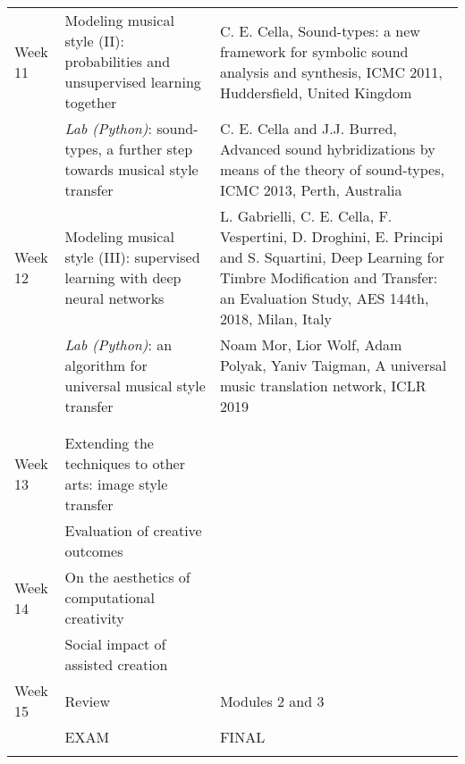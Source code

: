 \documentclass[letterpaper]{inzane_syllabus} %
\begin{document}
\begin{center}
\begin{tabularx}{\textwidth}{p{2cm}p{8cm} @{\hskip 0.5cm} p{9.5cm}}
Week 11 & Modeling musical style (II): probabilities and unsupervised learning together & C. E. Cella, Sound-types: a new framework for symbolic sound analysis and synthesis, ICMC 2011, Huddersfield, United Kingdom  \\

&\emph{Lab (Python)}: sound-types, a further step towards musical style transfer & C. E. Cella and J.J. Burred, Advanced sound hybridizations by means of the theory of sound-types, ICMC 2013, Perth, Australia \\

\arrayrulecolor{maingray}\hline
Week 12 & Modeling musical style (III): supervised learning with deep neural networks &  L. Gabrielli, C. E. Cella, F. Vespertini, D. Droghini, E. Principi and S. Squartini, Deep Learning for Timbre Modification and Transfer: an Evaluation Study, AES 144th, 2018, Milan, Italy \\
&\emph{ Lab (Python)}: an algorithm for universal musical style transfer &   Noam Mor, Lior Wolf, Adam Polyak, Yaniv Taigman, A universal music translation network, ICLR 2019 \\

& & \\ 
\arrayrulecolor{myCOLOR}\hline
\multicolumn{2}{l}{\textbf{\textcolor{myCOLOR}{\large MODULE 3: Connections  }}} \\
\hline
\arrayrulecolor{maingray}\hline

Week 13 & Extending the techniques to other arts: image style transfer & \\
&Evaluation of creative outcomes &  \\
\arrayrulecolor{maingray}\hline

Week 14 & On the aesthetics of computational creativity &  \\

& Social impact of assisted creation &  \\
\arrayrulecolor{maingray}\hline

Week 15 & Review & Modules 2 and 3\\

& EXAM & FINAL \\
\arrayrulecolor{myCOLOR}\hline
\hline 
\hline 
\hline 
\end{tabularx}
\end{center}
\end{document}

